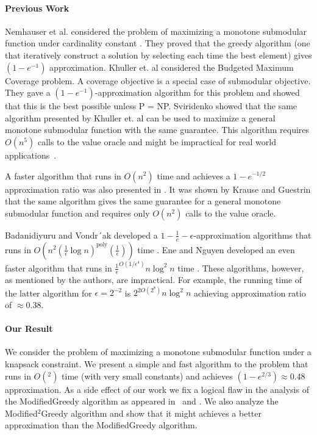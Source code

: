 \paragraph*{Previous Work}
Nemhauser et al. considered the problem of maximizing a monotone submodular function under cardinality constant \cite{Nemhauser1978}.
They proved that the greedy algorithm (one that iteratively construct a solution by selecting each time the best element) gives $(1 - e^{-1})$ approximation.
Khuller et. al considered the Budgeted Maximum Coverage problem\cite{khuller1999budgeted}.
A coverage objective is a special case of submodular objective.
They gave a $(1-e^{-1})$-approximation algorithm for this problem and showed that this is the best possible unless P = NP.
Sviridenko \cite{sviridenko2004note} showed that the same algorithm presented by
Khuller et. al can be used to maximize a general monotone submodular function
with the same guarantee.
This algorithm requires $O(n^5)$ calls to the value oracle and might be impractical for real world applications~\cite{lin2010multi}.

A faster algorithm that runs in $O(n^2)$ time and achieves a $1 - e^{-1/2}$ approximation ratio was also presented in \cite{khuller1999budgeted}.
It was shown by Krause and Guestrin \cite{krause2005note} that the same algorithm
gives the same guarantee for a general monotone submodular function and requires only $O(n^2)$ calls to the value oracle.

Badanidiyuru and Vondr´ak developed a $1 - \frac{1}{e} - \epsilon$-approximation 
algorithms that runs in 
$O(n^2(\frac{1}{\epsilon}\log n)^\text{poly}(\frac{1}{\epsilon}))$ time 
\cite{badanidiyuru2014fast}.
Ene and Nguyen developed an even faster algorithm that runs in $\frac{1}{\epsilon}^{O(1/\epsilon^4)}n \log^2 n$ time \cite{Alina2017}.
These algorithms, however, as mentioned by the authors, are impractical.
For example, the running time of the latter algorithm for $\epsilon = 2^{-2}$ is
$2^{2O(2^{8})}n\log^2n$ achieving approximation ratio of $\approx 0.38$.

\paragraph*{Our Result}
We consider the problem of maximizing a monotone submodular function under a knapsack constraint.
We present a simple and fast algorithm to the problem that runs in $O(^2)$ time (with very small constants) and achieves $(1 - e^{2/3}) \approx 0.48$ approximation.
As a side effect of our work we fix a logical flaw in the analysis of the ModifiedGreedy algorithm as appeared in~\cite{khuller1999budgeted} and \cite{krause2005note}.
We also analyze the Modified$^2$Greedy algorithm and show that it might achieves a better approximation than the ModifiedGreedy algorithm.